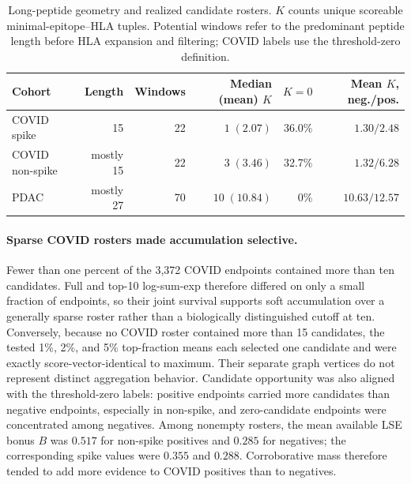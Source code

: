 \documentclass[11pt]{article}
\begin{document}
\begin{table}[htbp]
\centering
\small
\caption{Long-peptide geometry and realized candidate rosters. $K$ counts
unique scoreable minimal-epitope--HLA tuples. Potential windows refer to the
predominant peptide length before HLA expansion and filtering; COVID labels
use the threshold-zero definition.}
\label{tab:roster-geometry}
\begin{tabularx}{0.98\textwidth}{@{}>{\raggedright\arraybackslash}Xrrrrr@{}}
\toprule
Cohort & Length & Windows & Median (mean) $K$ & $K=0$ & Mean $K$, neg./pos. \\
\midrule
COVID spike & 15 & 22 & $1\;(2.07)$ & 36.0\% & $1.30/2.48$ \\
COVID non-spike & mostly 15 & 22 & $3\;(3.46)$ & 32.7\% & $1.32/6.28$ \\
PDAC & mostly 27 & 70 & $10\;(10.84)$ & 0\% & $10.63/12.57$ \\
\bottomrule
\end{tabularx}
\end{table}

\paragraph{Sparse COVID rosters made accumulation selective.}
Fewer than one percent of the 3,372 COVID endpoints contained more than ten
candidates. Full and top-10 log-sum-exp therefore differed on only a small
fraction of endpoints, so their joint survival supports soft accumulation over
a generally sparse roster rather than a biologically distinguished cutoff at
ten. Conversely, because no COVID roster contained more than 15 candidates,
the tested 1\%, 2\%, and 5\% top-fraction means each selected one candidate and
were exactly score-vector-identical to maximum. Their separate graph vertices
do not represent distinct aggregation behavior. Candidate opportunity was
also aligned with the threshold-zero labels: positive endpoints carried more
candidates than negative endpoints, especially in non-spike, and
zero-candidate endpoints were concentrated among negatives. Among nonempty
rosters, the mean available LSE bonus $B$ was $0.517$ for non-spike positives
and $0.285$ for negatives; the corresponding spike values were $0.355$ and
$0.288$. Corroborative mass therefore tended to add more evidence to COVID
positives than to negatives.
\end{document}
